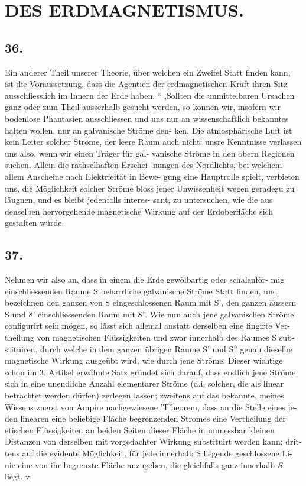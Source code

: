 \documentclass[12pt,a4paper]{article}
\begin{document}
\newpage


\section*{DES ERDMAGNETISMUS.}

\subsection*{36.}
Ein anderer Theil unserer Theorie, über welchen ein Zweifel Statt finden kann, ist-die Voraussetzung, dass die Agentien der erdmagnetischen Kraft ihren Sitz ausschliesslich im Innern der Erde haben. `` ,Sollten die unmittelbaren Ursachen ganz oder zum Theil ausserhalb gesucht werden, so können wir, insofern wir bodenlose Phantasien ausschliessen und uns nur an wissenschaftlich bekanntes halten wollen, nur an galvanische Ströme den- ken. Die atmosphärische Luft ist kein Leiter solcher Ströme, der leere Raum auch nicht: unsre Kenntnisse verlassen uns also, wenn wir einen Träger für gal- vanische Ströme in den obern Regionen suchen. Allein die räthselhaften Erschei- nungen des Nordlichts, bei welchem allem Anscheine nach Elektrieität in Bewe- gung eine Hauptrolle spielt, verbieten uns, die Möglichkeit solcher Ströme bloss jener Unwissenheit wegen geradezu zu läugnen, und es bleibt jedenfalls interes- sant, zu untersuchen, wie die aus denselben hervorgehende magnetische Wirkung auf der Erdoberfläche sich gestalten würde.

\subsection*{37.}
Nehmen wir also an, dass in einem die Erde gewölbartig oder schalenför- mig einschliessenden Raume S beharrliche galvanische Ströme Statt finden, und bezeichnen den ganzen von S eingeschlossenen Raum mit S', den ganzen äussern S und 8' einschliessenden Raum mit 8''. Wie nun auch jene galvanischen Ströme configurirt sein mögen, so lässt sich allemal anstatt derselben eine fingirte Ver- theilung von magnetischen Flüssigkeiten und zwar innerhalb des Raumes S sub- stituiren, durch welche in dem ganzen übrigen Raume S' und S'' genau dieselbe magnetische Wirkung ausgeübt wird, wie durch jene Ströme. Dieser wichtige schon im 3. Artikel erwähnte Satz gründet sich darauf, dass erstlich jene Ströme sich in eine unendliche Anzahl elementarer Ströme (d.i. solcher, die als linear betrachtet werden dürfen) zerlegen lassen; zweitens auf das bekannte, meines Wissens zuerst von Ampire nachgewiesene 'T'heorem, dass an die Stelle eines je- den linearen eine beliebige Fläche begrenzenden Stromes eine Vertheilung der etischen Flüssigkeiten an beiden Seiten dieser Fläche in unmessbar kleinen Distanzen von derselben mit vorgedachter Wirkung substituirt werden kann; drit- tens auf die evidente Möglichkeit, für jede innerhalb S liegende geschlossene Li- nie eine von ihr begrenzte Fläche anzugeben, die gleichfalls ganz innerhalb $S$ liegt. v.
\end{document}

